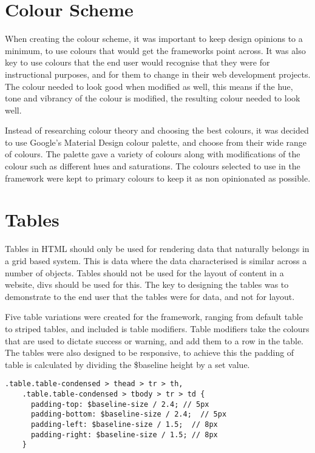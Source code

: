 \section*{Colour Scheme}
When creating the colour scheme, it was important to keep design opinions to a minimum, to use colours that would get the frameworks point across. It was also key to use colours that the end user would recognise that they were for instructional purposes, and for them to change in their web development projects. The colour needed to look good when modified as well, this means if the hue, tone and vibrancy of the colour is modified, the resulting colour needed to look well. 

Instead of researching colour theory and choosing the best colours, it was decided to use Google's Material Design \citet{Google17} colour palette, and choose from their wide range of colours. The palette  gave a variety of colours along with modifications of the colour such as different hues and saturations. The colours selected to use in the framework were kept to primary colours to keep it as non opinionated as possible.

\section*{Tables}
Tables in HTML should only be used for rendering data that naturally belongs in a grid based system. This is data where the data characterised is similar across a number of objects. Tables should not be used for the layout of content in a website, divs should be used for this. The key to designing the tables was to demonstrate to the end user that the tables were for data, and not for layout.

Five table variations were created for the framework, ranging from default table to striped tables, and included is table modifiers. Table modifiers take the colours that are used to dictate success or warning, and add them to a row in the table. The tables were also designed to be responsive, to achieve this the padding of table is calculated by dividing the \$baseline height by a set value. 

\begin{lstlisting}[language=CSS3]
    .table.table-condensed > thead > tr > th,
    .table.table-condensed > tbody > tr > td {
      padding-top: $baseline-size / 2.4; // 5px
      padding-bottom: $baseline-size / 2.4;  // 5px
      padding-left: $baseline-size / 1.5;  // 8px
      padding-right: $baseline-size / 1.5; // 8px
    }
\end{lstlisting}


